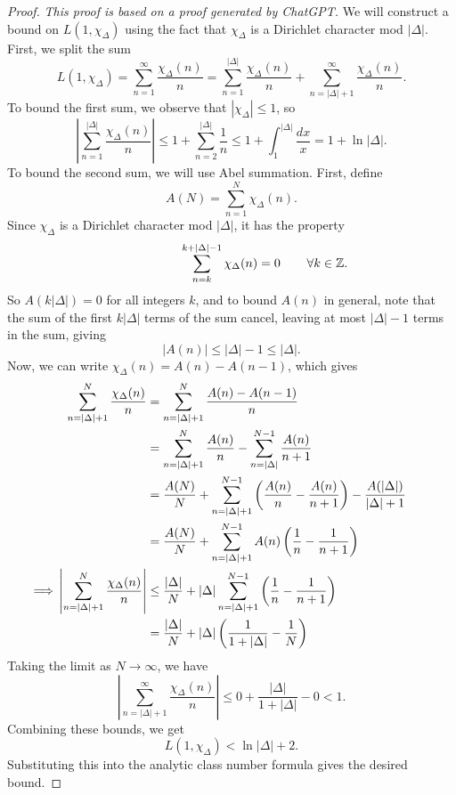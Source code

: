 \documentclass[honours,12pt]{unswthesis}
\newcommand{\Z}{\mathbb{Z}} %
\newcommand{\rnote}[1]{\rlap{\hspace{0.75cm}$#1$}}
\numberwithin{equation}{section}
\begin{document}
\begin{proof}
    \emph{This proof is based on a proof generated by ChatGPT.}
    We will construct a bound on $L(1, \chi_\Delta)$ using the fact that $\chi_\Delta$ is a Dirichlet character mod $|\Delta|$.
    First, we split the sum
    $$L(1, \chi_\Delta) = \sum_{n = 1}^{\infty} \frac{\chi_\Delta(n)}{n} = \sum_{n = 1}^{|\Delta|} \frac{\chi_\Delta(n)}{n} + \sum_{n = |\Delta| + 1}^{\infty} \frac{\chi_\Delta(n)}{n}.$$
    To bound the first sum, we observe that $|\chi_\Delta| \leq 1$, so
    $$\left| \sum_{n = 1}^{|\Delta|} \frac{\chi_\Delta(n)}{n} \right| \leq 1 + \sum_{n = 2}^{|\Delta|} \frac{1}{n} \leq 1 + \int_{1}^{|\Delta|} \frac{dx}{x} = 1 + \ln|\Delta|.$$
    To bound the second sum, we will use Abel summation.
    First, define
    $$A(N) = \sum_{n = 1}^{N} \chi_\Delta(n).$$
    Since $\chi_\Delta$ is a Dirichlet character mod $|\Delta|$, it has the property
    $$\sum_{n = k}^{k + |\Delta| - 1} \chi_\Delta(n) = 0 \rnote{\forall k \in \Z.}$$
    So $A(k|\Delta|) = 0$ for all integers $k$, and to bound $A(n)$ in general, note that the sum of the first $k|\Delta|$ terms of the sum cancel, leaving at most $|\Delta| - 1$ terms in the sum, giving
    $$|A(n)| \leq |\Delta| - 1 \leq |\Delta|.$$
    Now, we can write $\chi_\Delta(n) = A(n) - A(n - 1)$, which gives
    \begin{align*}
        \sum_{n = |\Delta| + 1}^{N} \frac{\chi_\Delta(n)}{n} &= \sum_{n = |\Delta| + 1}^{N} \frac{A(n) - A(n - 1)}{n} \\
        &= \sum_{n = |\Delta| + 1}^{N} \frac{A(n)}{n} - \sum_{n = |\Delta|}^{N - 1} \frac{A(n)}{n + 1} \\
        &= \frac{A(N)}{N} + \sum_{n = |\Delta| + 1}^{N - 1} \left( \frac{A(n)}{n} - \frac{A(n)}{n + 1} \right) - \frac{A(|\Delta|)}{|\Delta| + 1} \\
        &= \frac{A(N)}{N} + \sum_{n = |\Delta| + 1}^{N - 1} A(n) \left( \frac{1}{n} - \frac{1}{n + 1} \right) \\
        \llap{$\implies$} \left| \sum_{n = |\Delta| + 1}^{N} \frac{\chi_\Delta(n)}{n} \right| &\leq \frac{|\Delta|}{N} + |\Delta| \sum_{n = |\Delta| + 1}^{N - 1} \left( \frac{1}{n} - \frac{1}{n + 1} \right) \\
        &= \frac{|\Delta|}{N} + |\Delta| \left( \frac{1}{1 + |\Delta|} - \frac{1}{N} \right)
    \end{align*}
    Taking the limit as $N \rightarrow \infty$, we have
    $$\left| \sum_{n = |\Delta| + 1}^{\infty} \frac{\chi_\Delta(n)}{n} \right| \leq 0 + \frac{|\Delta|}{1 + |\Delta|} - 0 < 1.$$
    Combining these bounds, we get
    $$L(1, \chi_{\Delta}) < \ln|\Delta| + 2.$$
    Substituting this into the analytic class number formula gives the desired bound.
\end{proof}
\end{document}
